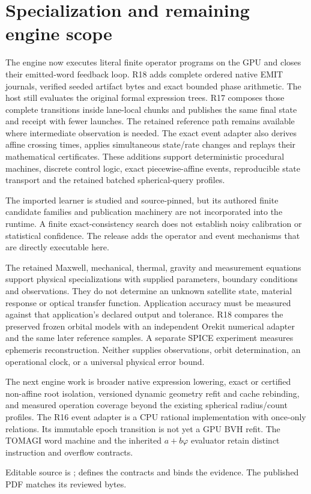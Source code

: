 \section{Specialization and remaining engine scope}
The engine now executes literal finite operator programs on the GPU and
closes their emitted-word feedback loop. R18 adds complete ordered native EMIT
journals, verified seeded artifact bytes and exact bounded phase arithmetic.
The host still evaluates the original formal expression trees. R17 composes those complete
transitions inside lane-local chunks and publishes the same final state
and receipt with fewer launches. The retained reference path remains
available where intermediate observation is needed. The exact event adapter also derives
affine crossing times, applies simultaneous state/rate changes and replays
their mathematical certificates. These additions support deterministic
procedural machines, discrete control logic, exact piecewise-affine events,
reproducible state transport and the retained batched spherical-query profiles.

The imported learner is studied and source-pinned, but its authored finite
candidate families and publication machinery are not incorporated into the
runtime. A finite exact-consistency search does not establish noisy calibration
or statistical confidence. The release adds the operator and event mechanisms
that are directly executable here.

The retained Maxwell, mechanical, thermal, gravity and measurement equations
support physical specializations with supplied parameters, boundary conditions
and observations. They do not determine an unknown satellite state, material
response or optical transfer function. Application accuracy must be measured
against that application's declared output and tolerance. R18 compares the
preserved frozen orbital models with an independent Orekit numerical adapter
and the same later reference samples. A separate SPICE experiment measures
ephemeris reconstruction. Neither supplies observations, orbit determination,
an operational clock, or a universal physical error bound.

The next engine work is broader native expression lowering, exact or certified
non-affine root isolation, versioned dynamic geometry refit and cache rebinding,
and measured operation coverage beyond the existing spherical radius/count
profiles. The R16 event adapter is a CPU rational implementation with once-only
relations. Its immutable epoch transition is not yet a GPU BVH refit. The
TOMAGI word machine and the inherited $a+b\varphi$ evaluator retain distinct
instruction and overflow contracts.

Editable source is ;  defines the contracts
and  binds the evidence. The published PDF matches its reviewed bytes.
